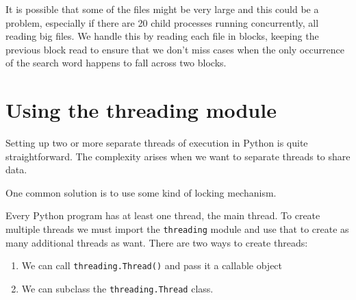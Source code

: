 It is possible that some of the files might be very large and this could be a problem, especially if there are 20 child processes running concurrently, all reading big files.
We handle this by reading each file in blocks, keeping the previous block read to ensure that we don’t miss cases when the only occurrence of the search word happens to fall across two blocks.


\section{Using the threading module}

Setting up two or more separate threads of execution in Python is quite straightforward.
The complexity arises when we want to separate threads to share data.

One common solution is to use some kind of locking mechanism.



Every Python program has at least one thread, the main thread.
To create multiple threads we must import the \verb|threading| module and use that to create as many additional threads as want.
There are two ways to create threads:
\begin{enumerate}
\item We can call \verb|threading.Thread()| and pass it a callable object
\item We can subclass the \verb|threading.Thread| class.
\end{enumerate}



